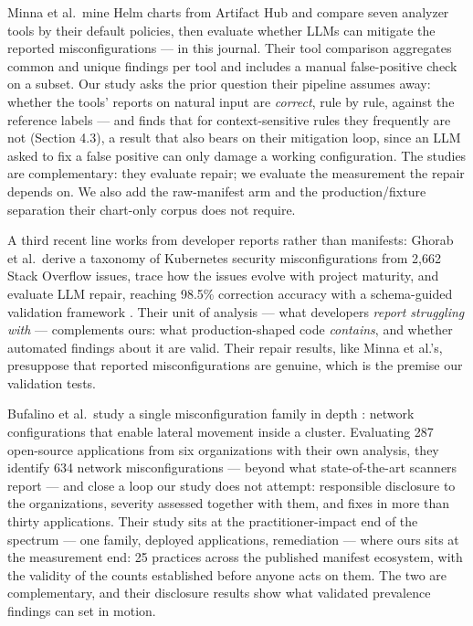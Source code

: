 \documentclass[pdflatex,sn-basic]{sn-jnl}
\begin{document}
Minna et al.~mine Helm charts from Artifact Hub and compare seven
analyzer tools by their default policies, then evaluate whether LLMs can
mitigate the reported misconfigurations \cite{Minna2025} --- in
this journal. Their tool comparison aggregates common and unique
findings per tool and includes a manual false-positive check on a
subset. Our study asks the prior question their pipeline assumes away:
whether the tools' reports on natural input are \emph{correct}, rule by
rule, against the reference labels --- and finds that for
context-sensitive rules they frequently are not (Section 4.3), a result
that also bears on their mitigation loop, since an LLM asked to fix a
false positive can only damage a working configuration. The studies are
complementary: they evaluate repair; we evaluate the measurement the
repair depends on. We also add the raw-manifest arm and the
production/fixture separation their chart-only corpus does not require.

A third recent line works from developer reports rather than manifests:
Ghorab et al.~derive a taxonomy of Kubernetes security misconfigurations
from 2,662 Stack Overflow issues, trace how the issues evolve with
project maturity, and evaluate LLM repair, reaching 98.5\% correction
accuracy with a schema-guided validation framework
\cite{Ghorab2026}. Their unit of analysis --- what developers
\emph{report struggling with} --- complements ours: what
production-shaped code \emph{contains}, and whether automated findings
about it are valid. Their repair results, like Minna et al.'s,
presuppose that reported misconfigurations are genuine, which is the
premise our validation tests.

Bufalino et al.~study a single misconfiguration family in depth
\cite{Bufalino2025}: network configurations that enable lateral
movement inside a cluster. Evaluating 287 open-source applications from
six organizations with their own analysis, they identify 634 network
misconfigurations --- beyond what state-of-the-art scanners report ---
and close a loop our study does not attempt: responsible disclosure to
the organizations, severity assessed together with them, and fixes in
more than thirty applications. Their study sits at the
practitioner-impact end of the spectrum --- one family, deployed
applications, remediation --- where ours sits at the measurement end:
25 practices across the published manifest ecosystem, with the validity
of the counts established before anyone acts on them. The two are
complementary, and their disclosure results show what validated
prevalence findings can set in motion.
\end{document}
